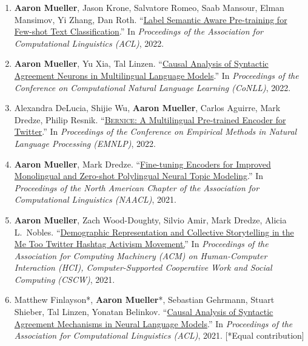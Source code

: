 \documentclass[10pt]{article}
\providecommand*\titlelink[2]{\href{#1}{\textcolor{accent}{#2}}}
\begin{document}
\begin{enumerate}[leftmargin=*, topsep=0pt, itemsep=0.25ex, partopsep=0ex, parsep=1ex, label=C\arabic*., ref=C\arabic*]
	\item \textbf{Aaron Mueller}, Jason Krone, Salvatore Romeo, Saab Mansour, Elman Mansimov, Yi Zhang, Dan Roth. ``\titlelink{https://aclanthology.org/2022.acl-long.570/}{Label Semantic Aware Pre-training for Few-shot Text Classification}.'' In \emph{Proceedings of the Association for Computational Linguistics (ACL)}, 2022.\label{pub:lsap}
	
	\item \textbf{Aaron Mueller}, Yu Xia, Tal Linzen. ``\titlelink{https://arxiv.org/abs/2210.14328}{Causal Analysis of Syntactic Agreement Neurons in Multilingual Language Models}.'' In \emph{Proceedings of the Conference on Computational Natural Language Learning (CoNLL)}, 2022.\label{pub:causal-multiling}
	
	\item Alexandra DeLucia, Shijie Wu, \textbf{Aaron Mueller}, Carlos Aguirre, Mark Dredze, Philip Resnik. ``\titlelink{https://preview.aclanthology.org/emnlp-22-ingestion/2022.emnlp-main.415/}{\textsc{Bernice}: A Multilingual Pre-trained Encoder for Twitter}.'' In \emph{Proceedings of the Conference on Empirical Methods in Natural Language Processing (EMNLP)}, 2022.
			
	\item \textbf{Aaron Mueller}, Mark Dredze. ``\titlelink{https://aclanthology.org/2021.naacl-main.243/}{Fine-tuning Encoders for Improved Monolingual and Zero-shot Polylingual Neural Topic Modeling}.'' In \emph{Proceedings of the North American Chapter of the Association for Computational Linguistics (NAACL)}, 2021.  
	
	\item \textbf{Aaron Mueller}, Zach Wood-Doughty, Silvio Amir, Mark Dredze, Alicia L.\ Nobles. ``\titlelink{https://dl.acm.org/doi/10.1145/3449181}{Demographic Representation and Collective Storytelling in the Me Too Twitter Hashtag Activism Movement.}'' In \emph{Proceedings of the Association for Computing Machinery (ACM) on Human-Computer Interaction (HCI), Computer-Supported Cooperative Work and Social Computing (CSCW)}, 2021.

	\item Matthew Finlayson*, \textbf{Aaron Mueller}*, Sebastian Gehrmann, Stuart Shieber, Tal Linzen, Yonatan Belinkov. ``\titlelink{https://aclanthology.org/2021.acl-long.144/}{Causal Analysis of Syntactic Agreement Mechanisms in Neural Language Models}.'' In \emph{Proceedings of the Association for Computational Linguistics (ACL)}, 2021. [*Equal contribution]\label{pub:causal}
	

\end{enumerate}
\end{document}
